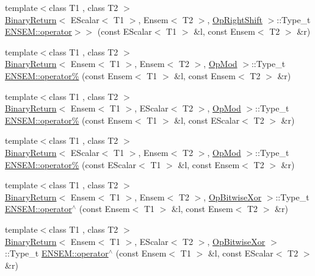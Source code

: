 \begin{DoxyCompactItemize}
\item 
{\footnotesize template$<$class T1 , class T2 $>$ }\\\mbox{\hyperlink{structBinaryReturn}{Binary\+Return}}$<$ E\+Scalar$<$ T1 $>$, Ensem$<$ T2 $>$, \mbox{\hyperlink{structOpRightShift}{Op\+Right\+Shift}} $>$\+::Type\+\_\+t \mbox{\hyperlink{group__eensem_ga8dbc329d9b31f5c8d7f4c54f10ea370b}{E\+N\+S\+E\+M\+::operator$>$$>$}} (const E\+Scalar$<$ T1 $>$ \&l, const Ensem$<$ T2 $>$ \&r)
\item 
{\footnotesize template$<$class T1 , class T2 $>$ }\\\mbox{\hyperlink{structBinaryReturn}{Binary\+Return}}$<$ Ensem$<$ T1 $>$, Ensem$<$ T2 $>$, \mbox{\hyperlink{structOpMod}{Op\+Mod}} $>$\+::Type\+\_\+t \mbox{\hyperlink{group__eensem_gaf077fbdf11a765fcbfe7fbb3b9e94a02}{E\+N\+S\+E\+M\+::operator\%}} (const Ensem$<$ T1 $>$ \&l, const Ensem$<$ T2 $>$ \&r)
\item 
{\footnotesize template$<$class T1 , class T2 $>$ }\\\mbox{\hyperlink{structBinaryReturn}{Binary\+Return}}$<$ Ensem$<$ T1 $>$, E\+Scalar$<$ T2 $>$, \mbox{\hyperlink{structOpMod}{Op\+Mod}} $>$\+::Type\+\_\+t \mbox{\hyperlink{group__eensem_gac6f1dfc7f3ac04dea5a10016a1cf8994}{E\+N\+S\+E\+M\+::operator\%}} (const Ensem$<$ T1 $>$ \&l, const E\+Scalar$<$ T2 $>$ \&r)
\item 
{\footnotesize template$<$class T1 , class T2 $>$ }\\\mbox{\hyperlink{structBinaryReturn}{Binary\+Return}}$<$ E\+Scalar$<$ T1 $>$, Ensem$<$ T2 $>$, \mbox{\hyperlink{structOpMod}{Op\+Mod}} $>$\+::Type\+\_\+t \mbox{\hyperlink{group__eensem_ga00d0a959bef6d8cd4aa976de1482281d}{E\+N\+S\+E\+M\+::operator\%}} (const E\+Scalar$<$ T1 $>$ \&l, const Ensem$<$ T2 $>$ \&r)
\item 
{\footnotesize template$<$class T1 , class T2 $>$ }\\\mbox{\hyperlink{structBinaryReturn}{Binary\+Return}}$<$ Ensem$<$ T1 $>$, Ensem$<$ T2 $>$, \mbox{\hyperlink{structOpBitwiseXor}{Op\+Bitwise\+Xor}} $>$\+::Type\+\_\+t \mbox{\hyperlink{group__eensem_gac8825f09186c8e0f8550839946bf2d37}{E\+N\+S\+E\+M\+::operator$^\wedge$}} (const Ensem$<$ T1 $>$ \&l, const Ensem$<$ T2 $>$ \&r)
\item 
{\footnotesize template$<$class T1 , class T2 $>$ }\\\mbox{\hyperlink{structBinaryReturn}{Binary\+Return}}$<$ Ensem$<$ T1 $>$, E\+Scalar$<$ T2 $>$, \mbox{\hyperlink{structOpBitwiseXor}{Op\+Bitwise\+Xor}} $>$\+::Type\+\_\+t \mbox{\hyperlink{group__eensem_ga6558c3ffb3c2fcd52505cddbc3c0b310}{E\+N\+S\+E\+M\+::operator$^\wedge$}} (const Ensem$<$ T1 $>$ \&l, const E\+Scalar$<$ T2 $>$ \&r)

\end{DoxyCompactItemize}

